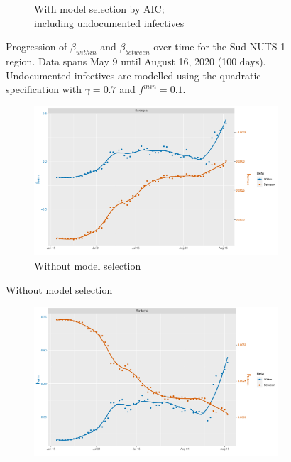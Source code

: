 \documentclass[12pt]{article}
\begin{document}
\begin{appendices}
\begin{figure}[H]
\begin{subfigure}{\textwidth}
    	      \caption{With model selection by AIC; \\ including undocumented infectives}
    	      \label{fig:beta_between_over_time_sud_aic_undoc}
    	    \end{subfigure}
    	    \caption{Progression of $\beta_{within}$ and $\beta_{between}$ over time for the Sud NUTS 1 region. Data spans May 9 until August 16, 2020 (100 days). Undocumented infectives are modelled using the quadratic specification with $\gamma = 0.7$ and $f^{min}=0.1$.}
    	    \label{fig:beta_between_over_time_sud}
        \end{figure}
		
		\begin{figure}[H]
    	    \centering
    	    \begin{subfigure}{\textwidth}
    	      \centering
    	      \includegraphics[width=0.8\linewidth]{output/model_between_lag14_betas_Isole_rolling.pdf}
    	      \caption{Without model selection}
    	      \label{fig:beta_between_over_time_isole_regular}
    	    \end{subfigure}
        \end{figure}
        \begin{figure}[H]\ContinuedFloat
    	    \begin{subfigure}{\textwidth}
    	      \centering
    	      \includegraphics[width=0.8\linewidth]{output/model_between_lag14_betas_Isole_aic_rolling.pdf}

\end{subfigure}
\end{figure}
\end{appendices}
\end{document}
